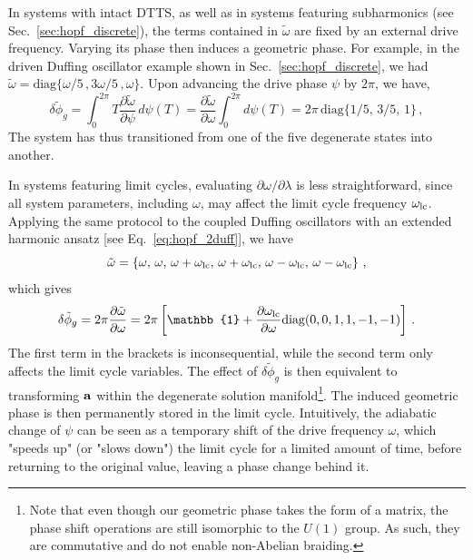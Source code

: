 In systems with intact DTTS, as well as in systems featuring subharmonics (see Sec.~\ref{sec:hopf_discrete}), the terms contained in $\tilde{\omega}$ are fixed by an external drive frequency. Varying its phase then induces a geometric phase. For example, in the driven Duffing oscillator example shown in Sec.~\ref{sec:hopf_discrete}, we had $\tilde{\omega} = \text{diag} \{\omega/5 \,, 3\omega/5 \,, \omega\}$. Upon advancing the drive phase $\psi$ by $2\pi$, we have,
\begin{equation}
\delta \tilde{\phi}_g = \int_0^{2\pi} T \frac{\partial \tilde{\omega}}{\partial \psi} \, d\psi(T) =  \frac{\partial \tilde{\omega}}{\partial \omega} \int_0^{2\pi} d\psi(T) = 2\pi\, \text{diag}\{1/5 ,\, 3/5, \, 1\}\,,
\end{equation}
The system has thus transitioned from one of the five degenerate states into another. %

In systems featuring limit cycles, evaluating $\partial{\omega} / \partial \lambda$ is less straightforward, since all system parameters, including $\omega$, may affect the limit cycle frequency $\omega_{\rm lc}$. Applying the same protocol to the coupled Duffing oscillators with an extended harmonic ansatz [see Eq.~\eqref{eq:hopf_2duff}], we have
\begin{equation}
\tilde{\omega} = \left \{ \omega ,\, \omega ,\, \omega + \omega_{\rm lc} ,\,  \omega + \omega_{\rm lc} ,\,  \omega - \omega_{\rm lc} , \,  \omega - \omega_{\rm lc} \right\} \,,
\end{equation}
which gives
\begin{equation} \label{eq:hopf_geoshift}
\delta \tilde{\phi}_g = 2 \pi \frac{\partial \tilde{\omega}}{\partial \omega} = 2\pi \left[\mathbb{1} + \frac{\partial \omega_{\rm lc}}{\partial \omega } \text{diag}(0,0,1,1,-1,-1) \right]  \,.
\end{equation}
The first term in the brackets is inconsequential, while the second term only affects the limit cycle variables. The effect of $\delta \tilde{\phi}_g$ is then equivalent to transforming $\vb{a}$ within the degenerate solution manifold\footnote{Note that even though our geometric phase takes the form of a matrix, the phase shift operations are still isomorphic to the $U(1)$ group. As such, they are commutative and do not enable non-Abelian braiding.}. The induced geometric phase is then permanently stored in the limit cycle. Intuitively, the adiabatic change of $\psi$ can be seen as a temporary shift of the drive frequency $\omega$, which "speeds up" (or "slows down") the limit cycle for a limited amount of time, before returning to the original value, leaving a phase change behind it.

